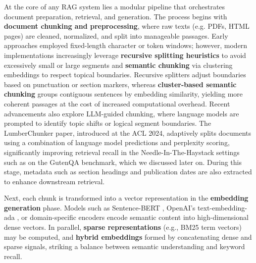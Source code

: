 \documentclass[12pt,twoside]{report}
\begin{document}
At the core of any RAG system lies a modular pipeline that orchestrates document preparation, retrieval, and generation. The process begins with \textbf{document chunking and preprocessing}, where raw texts (e.g. PDFs, HTML pages) are cleaned, normalized, and split into manageable passages. Early approaches employed fixed-length character or token windows; however, modern implementations increasingly leverage \textbf{recursive splitting heuristics}\cite{RecurrentChunking}\cite{SplittingHeuristics} to avoid excessively small or large segments and \textbf{semantic chunking} via clustering embeddings to respect topical boundaries. Recursive splitters adjust boundaries based on punctuation or section markers, whereas \textbf{cluster-based semantic chunking} groups contiguous sentences by embedding similarity, yielding more coherent passages at the cost of increased computational overhead.
Recent advancements also explore LLM-guided chunking, where language models are prompted to identify topic shifts or logical segment boundaries. The LumberChunker\cite{LumberChunker} paper, introduced at the ACL 2024, adaptively splits documents using a combination of language model predictions and perplexity scoring, significantly improving retrieval recall in the Needle-In-The-Haystack settings such as on the GutenQA benchmark, which we discussed later on. During this stage, metadata such as section headings and publication dates are also extracted to enhance downstream retrieval.

Next, each chunk is transformed into a vector representation in the \textbf{embedding generation} phase. Models such as Sentence-BERT \cite{SentenceBERT}, OpenAI's text-embedding-ada \cite{OpenAITextEmbedding}, or domain-specific encoders encode semantic content into high-dimensional dense vectors. In parallel, \textbf{sparse representations} (e.g., BM25\cite{BM25} term vectors) may be computed, and \textbf{hybrid embeddings} formed by concatenating dense and sparse signals, striking a balance between semantic understanding and keyword recall.
\end{document}
